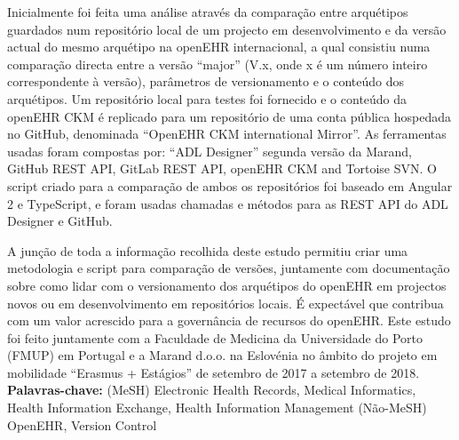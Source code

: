 \documentclass[mim_thesis.tex]{subfiles}
\begin{document}
Inicialmente foi feita uma análise através da comparação entre arquétipos guardados num repositório local de um projecto em desenvolvimento e da versão actual do mesmo arquétipo na openEHR internacional, a qual consistiu numa comparação directa entre a versão “major” (V.x, onde x é um número inteiro correspondente à versão), parâmetros de versionamento e o conteúdo dos arquétipos. Um repositório local para testes foi fornecido e o conteúdo da openEHR CKM é replicado para um repositório de uma conta pública hospedada no GitHub, denominada “OpenEHR CKM international Mirror”. As ferramentas usadas foram compostas por: “ADL Designer” segunda versão da Marand, GitHub REST API, GitLab REST API, openEHR CKM and Tortoise SVN. O script criado para a comparação de ambos os repositórios foi baseado em Angular 2 e TypeScript, e foram usadas chamadas e métodos para as REST API do ADL Designer e GitHub.

A junção de toda a informação recolhida deste estudo permitiu criar uma metodologia e script para comparação de versões, juntamente com documentação sobre como lidar com o versionamento dos arquétipos do openEHR em projectos novos ou em desenvolvimento em repositórios locais. É expectável que contribua com um valor acrescido para a governância de recursos do openEHR.
Este estudo foi feito juntamente com a Faculdade de Medicina da Universidade do Porto (FMUP) em Portugal e a Marand d.o.o. na Eslovénia no âmbito do projeto em mobilidade “Erasmus + Estágios” de setembro de 2017 a setembro de 2018.\\ 

\textbf{Palavras-chave:} (MeSH) Electronic Health Records, Medical Informatics, Health Information Exchange, Health Information Management (Não-MeSH) OpenEHR, Version Control
\end{document}
